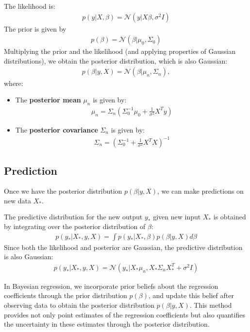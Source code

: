 The likelihood is:
\begin{align*}
	p(y | X, \beta) = \mathcal{N}(y | X\beta, \sigma^2 I)
\end{align*}
The prior is given by
\begin{align*}
	p(\beta) = \mathcal{N}(\beta | \mu_0, \Sigma_0)
\end{align*}
Multiplying the prior and the likelihood (and applying properties of Gaussian distributions), we obtain the posterior distribution, which is also Gaussian:
\begin{align*}
	p(\beta | y, X) = \mathcal{N}(\beta | \mu_n, \Sigma_n),
\end{align*}
where:
\begin{itemize}
    \item The \textbf{posterior mean} $\mu_n$ is given by:
		\begin{align*}
			\mu_n = \Sigma_n \left( \Sigma_0^{-1} \mu_0 + \frac{1}{\sigma^2} X^T y \right)
		\end{align*}
    \item The \textbf{posterior covariance} $\Sigma_n$ is given by:
		\begin{align*}
			\Sigma_n = \left( \Sigma_0^{-1} + \frac{1}{\sigma^2} X^T X \right)^{-1}
		\end{align*}
\end{itemize}



\subsection{Prediction}
Once we have the posterior distribution $ p(\beta | y, X) $, we can make predictions on new data $ X_*$.

The predictive distribution for the new output $ y_* $ given new input $ X_* $ is obtained by integrating over the posterior distribution of $\beta$:
\begin{align*}
	p(y_* | X_*, y, X) = \int p(y_* | X_*, \beta) p(\beta | y, X) d\beta
\end{align*}
Since both the likelihood and posterior are Gaussian, the predictive distribution is also Gaussian:
\begin{align*}
	p(y_* | X_*, y, X) = \mathcal{N}(y_* | X_*\mu_n, X_*\Sigma_n X_*^T + \sigma^2 I)
\end{align*}

In Bayesian regression, we incorporate prior beliefs about the regression coefficients through the prior distribution $ p(\beta) $, and update this belief after observing data to obtain the posterior distribution $ p(\beta | y, X) $. This method provides not only point estimates of the regression coefficients but also quantifies the uncertainty in these estimates through the posterior distribution.

